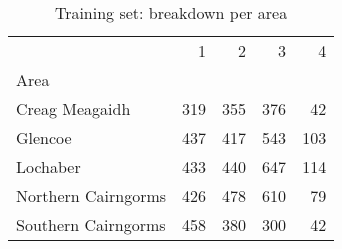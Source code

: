 \begin{table}[H]
\caption{Training set:  breakdown per area}
\label{tbl:sais_mapped_hazard_breakdown_per_area_train}
\begin{tabular}{lrrrr}
\toprule
 & 1 & 2 & 3 & 4 \\
Area &  &  &  &  \\
\midrule
Creag Meagaidh & 319 & 355 & 376 & 42 \\
Glencoe & 437 & 417 & 543 & 103 \\
Lochaber & 433 & 440 & 647 & 114 \\
Northern Cairngorms & 426 & 478 & 610 & 79 \\
Southern Cairngorms & 458 & 380 & 300 & 42 \\
\bottomrule
\end{tabular}
\end{table}
